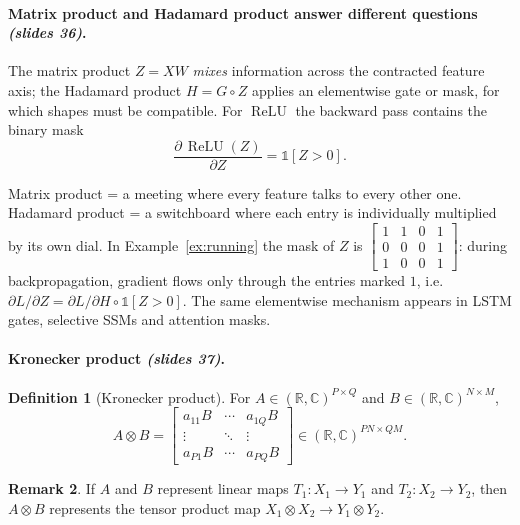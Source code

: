 \documentclass[11pt,a4paper]{article}
\newcommand{\R}{\mathbb{R}}
\newcommand{\C}{\mathbb{C}}
\newcommand{\ReLU}{\operatorname{ReLU}}
\newcommand{\ind}[1]{\mathbb{1}\!\left[#1\right]}
\newcommand{\slides}[1]{\texorpdfstring{\emph{(slides #1)}}{(slides #1)}}
\newcommand{\Had}{\circ}
\theoremstyle{definition}
\newtheorem{definition}{Definition}[section]
\newtheorem{remark}[definition]{Remark}
\theoremstyle{plain}
\begin{document}
\paragraph{Matrix product and Hadamard product answer different questions \slides{36}.}
The matrix product $Z=XW$ \emph{mixes} information across the contracted feature axis; the Hadamard product $H=G\Had Z$ applies an elementwise gate or mask, for which shapes must be compatible. For $\ReLU$ the backward pass contains the binary mask
\[
\frac{\partial\,\ReLU(Z)}{\partial Z}=\ind{Z>0}.
\]

\begin{intuition}
Matrix product = a meeting where every feature talks to every other one. Hadamard product = a switchboard where each entry is individually multiplied by its own dial. In Example~\ref{ex:running} the mask of $Z$ is $\begin{bmatrix}1&1&0&1\\0&0&0&1\\1&0&0&1\end{bmatrix}$: during backpropagation, gradient flows only through the entries marked $1$, i.e.\ $\partial L/\partial Z=\partial L/\partial H\Had\ind{Z>0}$. The same elementwise mechanism appears in LSTM gates, selective SSMs and attention masks.
\end{intuition}

\paragraph{Kronecker product \slides{37}.}
\begin{definition}[Kronecker product]
For $A\in(\R,\C)^{P\times Q}$ and $B\in(\R,\C)^{N\times M}$,
\[
A\otimes B=\begin{bmatrix}a_{11}B&\cdots&a_{1Q}B\\\vdots&\ddots&\vdots\\a_{P1}B&\cdots&a_{PQ}B\end{bmatrix}\in(\R,\C)^{PN\times QM}.
\]
\end{definition}

\begin{remark}
If $A$ and $B$ represent linear maps $T_1:X_1\to Y_1$ and $T_2:X_2\to Y_2$, then $A\otimes B$ represents the tensor product map $X_1\otimes X_2\to Y_1\otimes Y_2$.
\end{remark}
\end{document}
